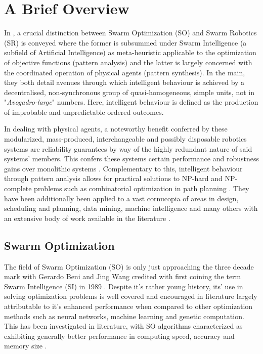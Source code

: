 \documentclass{report}
\begin{document}
\section{A Brief Overview}
In \cite{Beni2005a}, a crucial distinction between Swarm Optimization (SO) and Swarm Robotics (SR) is conveyed where the former is subsummed under Swarm Intelligence (a subfield of Artificial Intelligence) as meta-heuristic applicable to the optimization of objective functions (pattern analysis) and the latter is largely concerned with the coordinated operation of physical agents (pattern synthesis). In the main, they both detail avenues through which intelligent behaviour is achieved by a decentralised, non-synchronous group of quasi-homogeneous, simple units, not in "\textit{Avogadro-large}" numbers. Here, intelligent behaviour is defined as the production of improbable and unpredictable ordered outcomes.

In dealing with physical agents, a noteworthy benefit conferred by these modularized, mass-produced, interchangeable and possibly disposable robotics systems are reliability guarantees by way of the highly redundant nature of said systems' members. This confers these systems certain performance and robustness gains over monolithic systems \cite{Iocchi2001}. Complementary to this, intelligent behaviour through pattern analysis allows for practical solutions to NP-hard and NP-complete problems such as combinatorial optimization in path planning \cite{Yan2012}. They have been additionally been applied to a vast cornucopia of areas in design, scheduling and planning, data mining, machine intelligence and many others with an extensive body of work available in the literature \cite{Yang2011}.

\subsection{Swarm Optimization}
The field of Swarm Optimization (SO) is only just approaching the three decade mark with Gerardo Beni and Jing Wang credited with first coining the term Swarm Intelligence (SI) in 1989 \cite{Garg2009}. Despite it's rather young history, its' use in solving optimization problems is well covered and encouraged in literature largely attributable to it's enhanced performance when compared to other optimization methods such as neural networks, machine learning and genetic computation. This has been investigated in literature, with SO algorithms characterized as exhibiting generally better performance in computing speed, accuracy and memory size \cite{Tran2016}.
\end{document}
